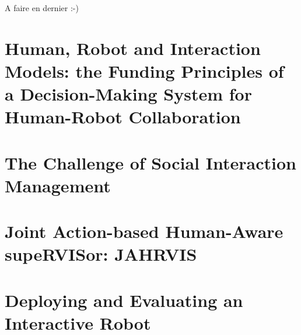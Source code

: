 \documentclass[english,a4paper,11pt,twoside]{StyleThese}
\begin{document}
A faire en dernier :-) 

\tableofcontents

\printnoidxglossary[type=\acronymtype]
%



\mainmatter


\part{Human, Robot and Interaction Models: the Funding Principles of a Decision-Making System for Human-Robot Collaboration}


\part{The Challenge of Social Interaction Management} 



\part{Joint Action-based Human-Aware supeRVISor: JAHRVIS}




\part{Deploying and Evaluating an Interactive Robot}




\newpage
\listoftodos[Notes]


\appendix






%


\cleardoublepage
\end{document}
